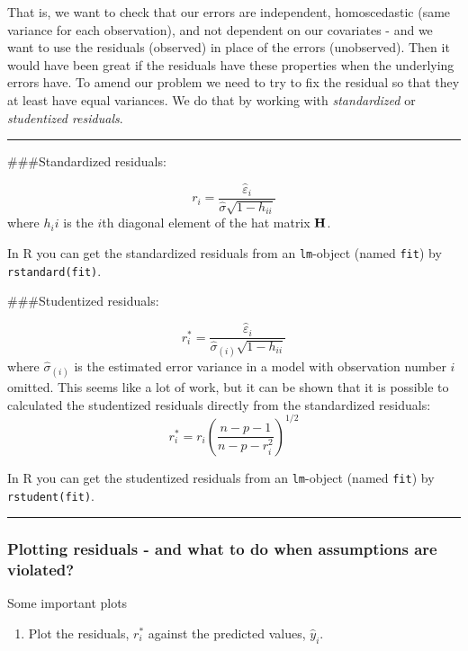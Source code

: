 \documentclass[
]{article}
\providecommand{\tightlist}{%
  \setlength{\itemsep}{0pt}\setlength{\parskip}{0pt}}
\begin{document}
That is, we want to check that our errors are independent, homoscedastic
(same variance for each observation), and not dependent on our
covariates - and we want to use the residuals (observed) in place of the
errors (unobserved). Then it would have been great if the residuals have
these properties when the underlying errors have. To amend our problem
we need to try to fix the residual so that they at least have equal
variances. We do that by working with \emph{standardized} or
\emph{studentized residuals}.

\begin{center}\rule{0.5\linewidth}{0.5pt}\end{center}

\#\#\#Standardized residuals:

\[r_i=\frac{\hat{\varepsilon}_i}{\hat{\sigma}\sqrt{1-h_{ii}}}\] where
\(h_ii\) is the \(i\)th diagonal element of the hat matrix \({\bf H}\).

In R you can get the standardized residuals from an \texttt{lm}-object
(named \texttt{fit}) by \texttt{rstandard(fit)}.

\#\#\#Studentized residuals:

\[r^*_i=\frac{\hat{\varepsilon}_i}{\hat{\sigma}_{(i)}\sqrt{1-h_{ii}}}\]
where \(\hat{\sigma}_{(i)}\) is the estimated error variance in a model
with observation number \(i\) omitted. This seems like a lot of work,
but it can be shown that it is possible to calculated the studentized
residuals directly from the standardized residuals:
\[r^*_i=r_i (\frac{n-p-1}{n-p-r_i^2})^{1/2}\]

In R you can get the studentized residuals from an \texttt{lm}-object
(named \texttt{fit}) by \texttt{rstudent(fit)}.

\begin{center}\rule{0.5\linewidth}{0.5pt}\end{center}

\hypertarget{plotting-residuals---and-what-to-do-when-assumptions-are-violated}{%
\subsubsection{Plotting residuals - and what to do when assumptions are
violated?}\label{plotting-residuals---and-what-to-do-when-assumptions-are-violated}}

Some important plots

\begin{enumerate}
\def\labelenumi{\arabic{enumi}.}
\tightlist
\item
  Plot the residuals, \(r^*_i\) against the predicted values,
  \(\hat{y}_i\).
\end{enumerate}
\end{document}
